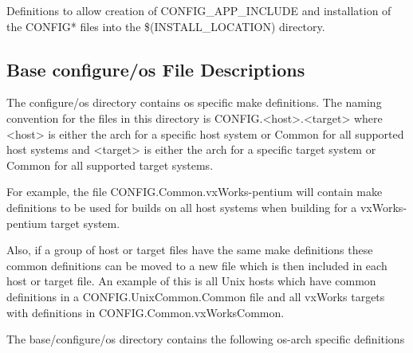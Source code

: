 \begin{description}\item Definitions to allow creation of CONFIG\_APP\_INCLUDE and installation of the CONFIG* files into the 
\$(INSTALL\_LOCATION) directory.

\end{description}\subsection{Base configure/os File Descriptions}

The configure/os directory contains os specific make definitions. The naming convention for the files in this directory is 
CONFIG.\textless{}host\textgreater{}.\textless{}target\textgreater{} where \textless{}host\textgreater{} is either the arch for a specific host system or Common for all supported host 
systems and \textless{}target\textgreater{} is either the arch for a specific target system or Common for all supported target systems. 

For example, the file CONFIG.Common.vxWorks-pentium will contain make definitions to be used for builds on all host 
systems when building for a vxWorks-pentium target system.

Also, if a group of host or target files have the same make definitions these common definitions can be moved to a new 
file which is then included in each host or target file. An example of this is all Unix hosts which have common definitions 
in a CONFIG.UnixCommon.Common file and all vxWorks targets with definitions in 
CONFIG.Common.vxWorksCommon.

The base/configure/os directory contains the following os-arch specific definitions


